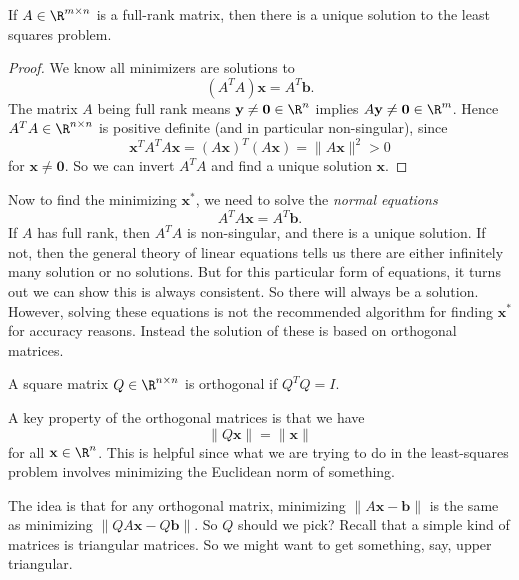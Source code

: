 \documentclass[a4paper]{article}
\begin{document}
\begin{cor}
  If $A \in \R^{m \times n}$ is a full-rank matrix, then there is a unique solution to the least squares problem.
\end{cor}

\begin{proof}
  We know all minimizers are solutions to
  \[
    (A^T A)\mathbf{x} = A^T \mathbf{b}.
  \]
  The matrix $A$ being full rank means $\mathbf{y} \not= \mathbf{0} \in \R^n$ implies $A\mathbf{y} \not= \mathbf{0} \in \R^m$. Hence $A^T A \in \R^{n \times n}$ is positive definite (and in particular non-singular), since
  \[
    \mathbf{x}^TA^T A\mathbf{x} = (A \mathbf{x})^T (A \mathbf{x}) = \|A \mathbf{x}\|^2 > 0
  \]
  for $\mathbf{x} \not= \mathbf{0}$. So we can invert $A^T A$ and find a unique solution $\mathbf{x}$.
\end{proof}

Now to find the minimizing $\mathbf{x}^*$, we need to solve the \emph{normal equations}
\[
  A^T A\mathbf{x} = A^T \mathbf{b}.
\]
If $A$ has full rank, then $A^T A$ is non-singular, and there is a unique solution. If not, then the general theory of linear equations tells us there are either infinitely many solution or no solutions. But for this particular form of equations, it turns out we can show this is always consistent. So there will always be a solution. However, solving these equations is not the recommended algorithm for finding $\mathbf{x}^*$ for accuracy reasons. Instead the solution of these is based on orthogonal matrices.

\begin{defi}
  A square matrix $Q \in \R^{n \times n}$ is orthogonal if $Q^T Q = I$.
\end{defi}

A key property of the orthogonal matrices is that we have
\[
  \|Q\mathbf{x}\| = \|\mathbf{x}\|
\]
for all $\mathbf{x} \in \R^n$. This is helpful since what we are trying to do in the least-squares problem involves minimizing the Euclidean norm of something.

The idea is that for any orthogonal matrix, minimizing $\|A\mathbf{x} - \mathbf{b}\|$ is the same as minimizing $\|QA \mathbf{x} - Q\mathbf{b}\|$. So $Q$ should we pick? Recall that a simple kind of matrices is triangular matrices. So we might want to get something, say, upper triangular.
\end{document}
